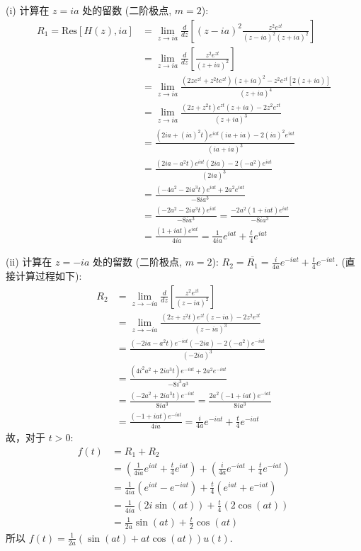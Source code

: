 \documentclass[linespread=1.5,openany]{book}%
\def\diff{d}%
\theoremstyle{plain}
\newcommand{\diff}{\mathop{}\!\mathrm{d}}  %
\begin{document}
{{{{{{{									(i) 计算在 $z=ia$ 处的留数 (二阶极点, $m=2$):
									\begin{align*}
										R_1 = \text{Res}[H(z), ia] &= \lim_{z\to ia} \frac{\diff}{\diff z} \left[ (z-ia)^2 \frac{z^2 e^{zt}}{(z-ia)^2(z+ia)^2} \right] \\[6pt]
										&= \lim_{z\to ia} \frac{\diff}{\diff z} \left[ \frac{z^2 e^{zt}}{(z+ia)^2} \right] \\[8pt]
										&= \lim_{z\to ia} \frac{(2z e^{zt} + z^2 t e^{zt})(z+ia)^2 - z^2 e^{zt} [2(z+ia)]}{(z+ia)^4} \\[8pt]
										&= \lim_{z\to ia} \frac{(2z + z^2 t)e^{zt}(z+ia) - 2z^2 e^{zt}}{(z+ia)^3} \\[8pt]
										&= \frac{(2ia + (ia)^2 t)e^{iat}(ia+ia) - 2(ia)^2 e^{iat}}{(ia+ia)^3} \\[8pt]
										&= \frac{(2ia - a^2 t)e^{iat}(2ia) - 2(-a^2)e^{iat}}{(2ia)^3} \\[6pt]
										&= \frac{(-4a^2 - 2ia^3 t)e^{iat} + 2a^2 e^{iat}}{-8ia^3} \\[8pt]
										&= \frac{(-2a^2 - 2ia^3 t)e^{iat}}{-8ia^3} = \frac{-2a^2(1 + iat)e^{iat}}{-8ia^3} \\[8pt]
										&= \frac{(1 + iat)e^{iat}}{4ia} = \frac{1}{4ia}e^{iat} + \frac{t}{4}e^{iat}
									\end{align*}
									
									(ii) 计算在 $z=-ia$ 处的留数 (二阶极点, $m=2$):
									$R_2 = \overline{R_1} = \frac{i}{4a}e^{-iat} + \frac{t}{4}e^{-iat}$.
									(直接计算过程如下):
									\begin{align*}
										R_2 &= \lim_{z\to -ia} \frac{\diff}{\diff z} \left[ \frac{z^2 e^{zt}}{(z-ia)^2} \right] \\[6pt]
										&= \lim_{z\to -ia} \frac{(2z + z^2 t)e^{zt}(z-ia) - 2z^2 e^{zt}}{(z-ia)^3} \\[6pt]
										&= \frac{(-2ia - a^2 t)e^{-iat}(-2ia) - 2(-a^2)e^{-iat}}{(-2ia)^3} \\[6pt]
										&= \frac{(4i^2a^2 + 2ia^3 t)e^{-iat} + 2a^2 e^{-iat}}{-8i^3a^3} \\[6pt]
										&= \frac{(-2a^2 + 2ia^3 t)e^{-iat}}{8ia^3} = \frac{2a^2(-1 + iat)e^{-iat}}{8ia^3} \\[6pt]
										&= \frac{(-1 + iat)e^{-iat}}{4ia} = \frac{i}{4a}e^{-iat} + \frac{t}{4}e^{-iat}
									\end{align*}
									故，对于 $t>0$:
									\begin{align*}
										f(t) &= R_1 + R_2 \\[6pt]
										&= \left(\frac{1}{4ia}e^{iat} + \frac{t}{4}e^{iat}\right) + \left(\frac{i}{4a}e^{-iat} + \frac{t}{4}e^{-iat}\right) \\[6pt]
										&= \frac{1}{4ia}(e^{iat} - e^{-iat}) + \frac{t}{4}(e^{iat} + e^{-iat}) \\[6pt]
										&= \frac{1}{4ia}(2i\sin(at)) + \frac{t}{4}(2\cos(at)) \\[6pt]
										&= \frac{1}{2a}\sin(at) + \frac{t}{2}\cos(at)
									\end{align*}
									所以 $f(t) = \frac{1}{2a}(\sin(at) + at\cos(at))u(t)$.
									\vspace{\baselineskip}
									
}}}}}}}
\end{document}
